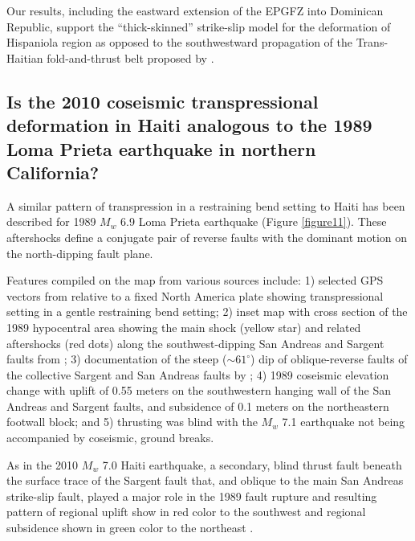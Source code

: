 \documentclass[linenumbers,draft]{agujournal}
\begin{document}
Our results, including the eastward extension of the EPGFZ into Dominican Republic, support the ``thick-skinned'' strike-slip model for the deformation of Hispaniola region as opposed to the southwestward propagation of the Trans-Haitian fold-and-thrust belt proposed by \citet{pubellier2000plate}. 

\subsection{Is the 2010 coseismic transpressional deformation in Haiti analogous to the 1989 Loma Prieta earthquake in northern California?}
A similar pattern of transpression in a restraining bend setting to Haiti has been described for 1989 $M_w$ 6.9 Loma Prieta earthquake \citep{marshall1991faulting} (Figure \ref{figure11}). These aftershocks define a conjugate pair of reverse faults with the dominant motion on the north-dipping fault plane.

Features compiled on the map from various sources include: 1) selected GPS vectors from \citet{UNAVCO2009} relative to a fixed North America plate showing transpressional setting in a gentle restraining bend setting; 2) inset map with cross section of the 1989 hypocentral area showing the main shock (yellow star) and related aftershocks (red dots) along the southwest-dipping San Andreas and Sargent faults from \citet{marshall1991faulting}; 3) documentation of the steep ($\sim61^{\circ}$) dip of oblique-reverse faults of the collective Sargent and San Andreas faults by \citet{marshall1991faulting}; 4) 1989 coseismic elevation change with uplift of 0.55 meters on the southwestern hanging wall of the San Andreas and Sargent faults, and subsidence of 0.1 meters on the northeastern footwall block; and 5) thrusting was blind with the $M_w$ 7.1 earthquake not being accompanied by coseismic, ground breaks. 

As in the 2010 $M_w$ 7.0 Haiti earthquake, a secondary, blind thrust fault beneath the surface trace of the Sargent fault that, and oblique to the main San Andreas strike-slip fault, played a major role in the 1989 fault rupture and resulting pattern of regional uplift show in red color to the southwest and regional subsidence shown in green color to the northeast \citep{olson1990seismicity}.
\end{document}

